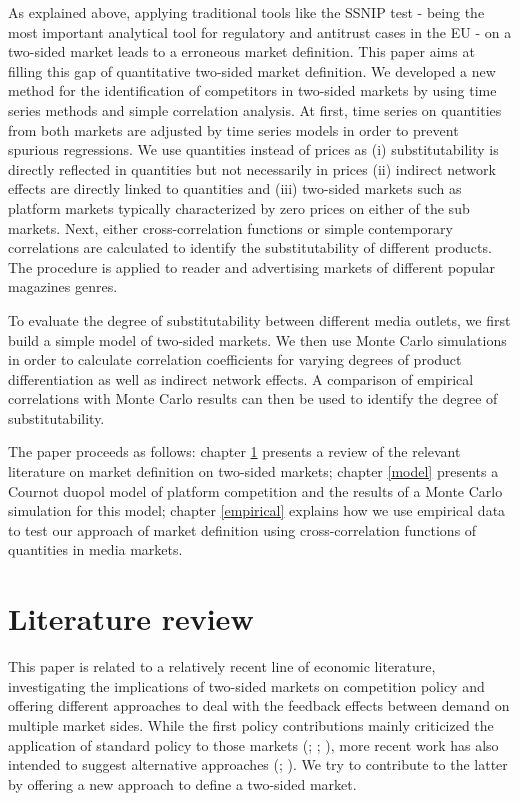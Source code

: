 \documentclass[12pt,a4paper,notitlepage]{article}
\begin{document}
As explained above, applying traditional tools like the SSNIP test - being the most important analytical tool for regulatory and antitrust cases in the EU - on a two-sided market leads to a erroneous market definition. This paper aims at filling this gap of quantitative two-sided market definition. We developed a new method for the identification of competitors in two-sided markets by using time series methods and simple correlation analysis. At first, time series on quantities from both markets are adjusted by time series models in order to prevent spurious regressions. We use quantities instead of prices as (i) substitutability is directly reflected in quantities but not necessarily in prices (ii) indirect network effects are directly linked to quantities  and (iii) two-sided markets such as platform markets typically characterized by zero prices on either of the sub markets. Next, either cross-correlation functions or simple contemporary correlations are calculated to identify the substitutability of different products. The procedure is applied to reader and advertising markets of different popular magazines genres. 

To evaluate the degree of substitutability between different media outlets, we first build a simple model of two-sided markets. We then use Monte Carlo simulations in order to calculate correlation coefficients for varying degrees of product differentiation as well as indirect network effects. A comparison of empirical correlations with Monte Carlo results can then be used to identify the degree of substitutability. 

The paper proceeds as follows: chapter \ref{litrev} presents a review of the relevant literature on market definition on two-sided markets; chapter \ref{model} presents a Cournot duopol model of platform competition and the results of a Monte Carlo simulation for this model; chapter \ref{empirical}  explains how we use empirical data to test our approach of market definition using cross-correlation functions of quantities in media markets.  





\section{Literature review}\label{litrev}
This paper is related to a relatively recent line of economic literature, investigating the implications of two-sided markets on competition policy and offering different approaches to deal with the feedback effects between demand on multiple market sides. While the first policy contributions mainly criticized the application of standard policy to those markets (\citet{wright_one-sided_2004}; \citet{leonello_horizontal_2010}; \cite{chandra_mergers_2009}), more recent work has also intended to suggest alternative approaches (\citet{argentesi_estimating_2007}; \citet{song_estimating_2015}). We try to contribute to the latter by offering a new approach to define a two-sided market. 
\end{document}
